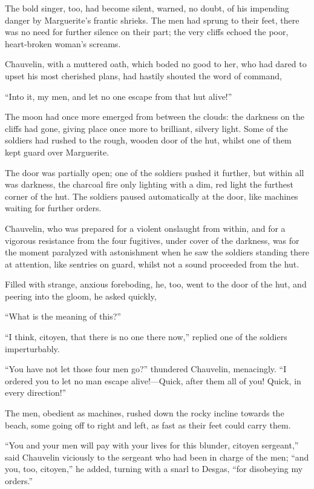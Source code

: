 The bold singer, too, had become silent, warned, no doubt, of his impending danger by Marguerite's frantic shrieks. The men had sprung to their feet, there was no need for further silence on their part; the very cliffs echoed the poor, heart-broken woman's screams.

Chauvelin, with a muttered oath, which boded no good to her, who had dared to upset his most cherished plans, had hastily shouted the word of command,\longdash


\enquote{Into it, my men, and let no one escape from that hut alive!}

The moon had once more emerged from between the clouds: the darkness on the cliffs had gone, giving place once more to brilliant, silvery light. Some of the soldiers had rushed to the rough, wooden door of the hut, whilst one of them kept guard over Marguerite.

The door was partially open; one of the soldiers pushed it further, but within all was darkness, the charcoal fire only lighting with a dim, red light the furthest corner of the hut. The soldiers paused automatically at the door, like machines waiting for further orders.

Chauvelin, who was prepared for a violent onslaught from within, and for a vigorous resistance from the four fugitives, under cover of the darkness, was for the moment paralyzed with astonishment when he saw the soldiers standing there at attention, like sentries on guard, whilst not a sound proceeded from the hut.

Filled with strange, anxious foreboding, he, too, went to the door of the hut, and peering into the gloom, he asked quickly,\longdash


\enquote{What is the meaning of this?}

\enquote{I think, citoyen, that there is no one there now,} replied one of the soldiers imperturbably.

\enquote{You have not let those four men go?} thundered Chauvelin, menacingly. \enquote{I ordered you to let no man escape alive!---Quick, after them all of you! Quick, in every direction!}

The men, obedient as machines, rushed down the rocky incline towards the beach, some going off to right and left, as fast as their feet could carry them.

\enquote{You and your men will pay with your lives for this blunder, citoyen sergeant,} said Chauvelin viciously to the sergeant who had been in charge of the men; \enquote{and you, too, citoyen,} he added, turning with a snarl to Desgas, \enquote{for disobeying my orders.}

